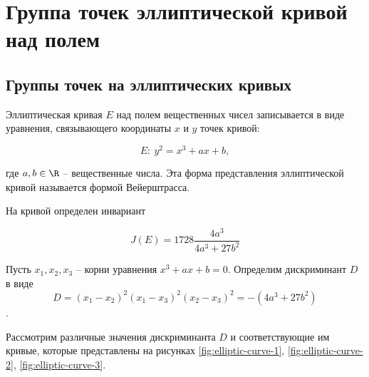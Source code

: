 \section{Группа точек эллиптической кривой над полем}

\subsection{Группы точек на эллиптических кривых}

Эллиптическая кривая $E$ над полем вещественных чисел записывается в виде уравнения, связывающего координаты $x$ и $y$ точек кривой:

\begin{equation}
    E: ~ y^{2} = x^{3} + ax + b,
    \label{Wer}
\end{equation}

где $a,b \in \R$ -- вещественные числа. Эта форма представления эллиптической кривой называется формой Вейерштрасса.

На кривой определен инвариант

\begin{equation}
    J(E)=1728\frac{4a^{3} }{4a^{3} +27b^{2} }
\end{equation}

Пусть $x_{1} ,x_{2} ,x_{3} $ -- корни уравнения $x^3 + a x + b = 0$. Определим дискриминант $D$ в виде
    \[ D =(x_1 - x_2)^2 (x_1 - x_3)^2 (x_2 - x_3)^2 = - (4 a^3 + 27 b^2) \].

Рассмотрим различные значения дискриминанта $D$ и соответствующие им кривые, которые представлены на рисунках \ref{fig:elliptic-curve-1}, \ref{fig:elliptic-curve-2}, \ref{fig:elliptic-curve-3}.

